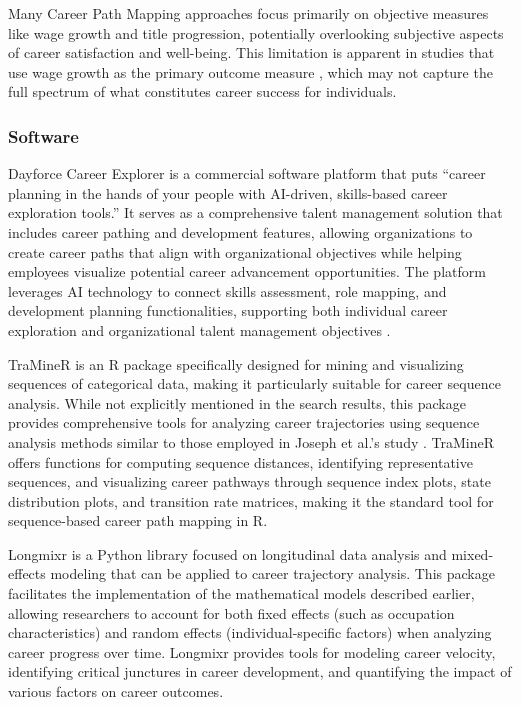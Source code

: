 \documentclass[../main.tex]{subfiles}
\begin{document}
Many Career Path Mapping approaches focus primarily on objective measures like wage growth and title progression, potentially overlooking subjective aspects of career satisfaction and well-being. This limitation is apparent in studies that use wage growth as the primary outcome measure \citep{workforcegps2023}, which may not capture the full spectrum of what constitutes career success for individuals.

\subsubsection{Software}

Dayforce Career Explorer is a commercial software platform that puts ``career planning in the hands of your people with AI-driven, skills-based career exploration tools.'' It serves as a comprehensive talent management solution that includes career pathing and development features, allowing organizations to create career paths that align with organizational objectives while helping employees visualize potential career advancement opportunities. The platform leverages AI technology to connect skills assessment, role mapping, and development planning functionalities, supporting both individual career exploration and organizational talent management objectives \citep{dayforce2023}.

TraMineR is an R package specifically designed for mining and visualizing sequences of categorical data, making it particularly suitable for career sequence analysis. While not explicitly mentioned in the search results, this package provides comprehensive tools for analyzing career trajectories using sequence analysis methods similar to those employed in Joseph et al.'s study \citep{joseph2012}. TraMineR offers functions for computing sequence distances, identifying representative sequences, and visualizing career pathways through sequence index plots, state distribution plots, and transition rate matrices, making it the standard tool for sequence-based career path mapping in R.

Longmixr is a Python library focused on longitudinal data analysis and mixed-effects modeling that can be applied to career trajectory analysis. This package facilitates the implementation of the mathematical models described earlier, allowing researchers to account for both fixed effects (such as occupation characteristics) and random effects (individual-specific factors) when analyzing career progress over time. Longmixr provides tools for modeling career velocity, identifying critical junctures in career development, and quantifying the impact of various factors on career outcomes.
\end{document}
